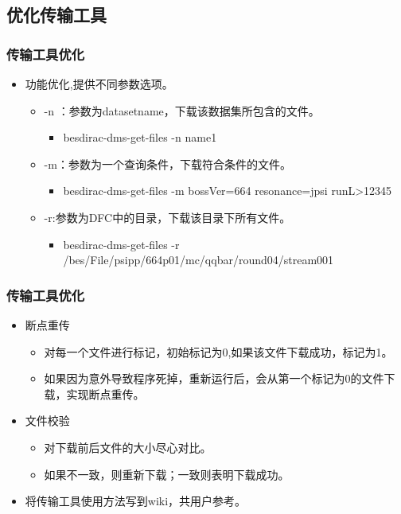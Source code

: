 \documentclass{beamer}
\begin{document}
\begin{CJK*}{UTF8}{}
\section{优化传输工具}
\begin{frame}
  \frametitle{传输工具优化}
  \begin{itemize}
    \item 功能优化,提供不同参数选项。 
      \begin{itemize}
        \item -n ：参数为datasetname，下载该数据集所包含的文件。 
          \begin{itemize}
            \item besdirac-dms-get-files -n name1 
          \end{itemize}
        \item -m：参数为一个查询条件，下载符合条件的文件。
          \begin{itemize}
            \item besdirac-dms-get-files -m bossVer=664 resonance=jpsi runL>12345 
          \end{itemize}
        \item -r:参数为DFC中的目录，下载该目录下所有文件。
          \begin{itemize}
            \item besdirac-dms-get-files -r /bes/File/psipp/664p01/mc/qqbar/round04/stream001 
          \end{itemize}
      \end{itemize}
  \end{itemize}
\end{frame}
\begin{frame}
  \frametitle{传输工具优化}
  \begin{itemize}
    \item 断点重传 
      \begin{itemize}
        \item 对每一个文件进行标记，初始标记为0,如果该文件下载成功，标记为1。 
        \item 如果因为意外导致程序死掉，重新运行后，会从第一个标记为0的文件下载，实现断点重传。
      \end{itemize}
    \item 文件校验 
      \begin{itemize}
        \item 对下载前后文件的大小尽心对比。
        \item 如果不一致，则重新下载；一致则表明下载成功。 
      \end{itemize}
    \item 将传输工具使用方法写到wiki，共用户参考。
  \end{itemize}
\end{frame}

\end{CJK*}
\end{document}
